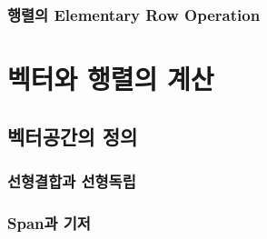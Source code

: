 \subsubsection{행렬의 Elementary Row Operation}

\section{벡터와 행렬의 계산}


\subsection{벡터공간의 정의} 

\subsubsection{선형결합과 선형독립} 

\subsubsection{Span과 기저} 

